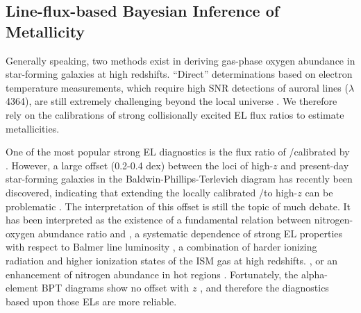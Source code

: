 \subsection{Line-flux-based Bayesian Inference of Metallicity}\label{subsect:bayes}



Generally speaking, two methods exist in deriving gas-phase oxygen abundance in star-forming galaxies at high redshifts.
``Direct'' determinations based on electron temperature measurements, which require high SNR
detections of auroral lines (\eg \OIII$\lambda$4364), are still extremely challenging beyond the local universe \citep[see][for a
rare example]{Sanders:2016uo}.
We therefore rely on the calibrations of strong collisionally excited EL flux ratios to estimate metallicities.

One of the most popular strong EL diagnostics is the flux ratio of \NII/\Ha calibrated by \citet{2004MNRAS.348L..59P}.  However, a
large offset (0.2-0.4 dex) between the loci of high-$z$ and present-day star-forming galaxies in the Baldwin-Phillips-Terlevich
\citep[BPT,][]{Baldwin:1981ev} diagram has recently been discovered, indicating that extending the locally calibrated \NII/\Ha to
high-$z$ can be problematic \citep{2015ApJ...801...88S,Sanders:2015gk}.  The interpretation of this offset is still the topic of
much debate. It has been interpreted as the existence of a fundamental relation between nitrogen-oxygen abundance ratio and \Mstar
\citep{Masters:2016vr}, a systematic dependence of strong EL properties with respect to Balmer line luminosity
\citep{Cowie:2016fv}, a combination of harder ionizing radiation and higher ionization states of the ISM gas at high redshifts.
\citep{2014ApJ...795..165S,Steidel:2016wu}, or an enhancement of nitrogen abundance in hot \HII regions \citep{Pilyugin:2010bx}.  
Fortunately, the alpha-element BPT diagrams show no offset with $z$ \citep{2015ApJ...801...88S,Sanders:2015gk}, and therefore the 
diagnostics based upon those ELs are more reliable.

